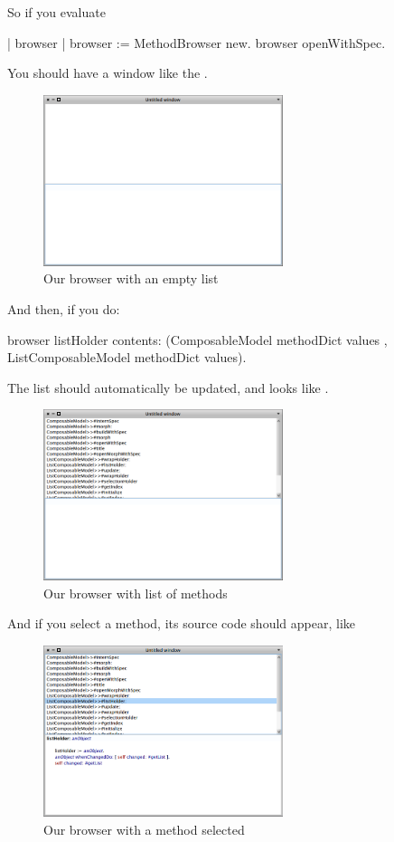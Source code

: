 \documentclass[a4paper,10pt,twoside]{book}
\begin{document}
So if you evaluate
\begin{code}{}
| browser |
browser := MethodBrowser new.
browser openWithSpec.
\end{code}
You should have a window like the .
\begin{figure}[ht]
\begin{center}
	\includegraphics[width=7cm]{MethodBrowser1}
	\caption{Our browser with an empty list}
\end{center}
\end{figure}

And then, if you do:
\begin{code}{}
browser  listHolder contents: (ComposableModel methodDict values , ListComposableModel methodDict values).
\end{code}
The list should automatically be updated, and looks like .
\begin{figure}[ht]
\begin{center}
	\includegraphics[width=7cm]{MethodBrowser2}
	\caption{Our browser with list of methods}
\end{center}
\end{figure}

\newpage
And if you select a method, its source code should appear, like 

\begin{figure}[ht]
\begin{center}
	\includegraphics[width=7cm]{MethodBrowser3}
	\caption{Our browser with a method selected}
\end{center}
\end{figure}
\end{document}
